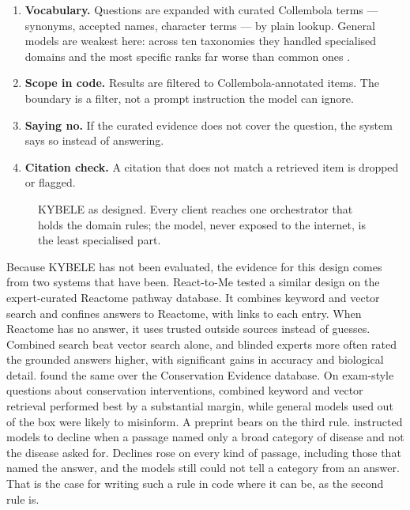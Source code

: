 \begin{enumerate}
  \item \textbf{Vocabulary.} Questions are expanded with curated Collembola
    terms --- synonyms, accepted names, character terms --- by plain lookup.
    General models are weakest here: across ten taxonomies they handled
    specialised domains and the most specific ranks far worse than common
    ones \parencite{sun2024taxoglimpse}.
  \item \textbf{Scope in code.} Results are filtered to Collembola-annotated
    items. The boundary is a filter, not a prompt instruction the model can
    ignore.
  \item \textbf{Saying no.} If the curated evidence does not cover the question,
    the system says so instead of answering.
  \item \textbf{Citation check.} A citation that does not match a retrieved item
    is dropped or flagged.
\end{enumerate}

\begin{figure}[htbp]
\centering
{}
\caption{KYBELE as designed. Every client reaches one orchestrator that holds
the domain rules; the model, never exposed to the internet, is the least
specialised part.}
\label{fig:kybele}
\end{figure}

Because KYBELE has not been evaluated, the evidence for this design comes from
two systems that have been. React-to-Me \parencite{mohammadi2025reacttome}
tested a similar design on the expert-curated Reactome pathway database. It combines keyword and vector search
and confines answers to Reactome, with links to each entry. When Reactome has
no answer, it uses trusted outside sources instead of guesses. Combined search beat
vector search alone, and blinded experts more often rated the grounded answers
higher, with significant gains in accuracy and biological detail.
\textcite{iyer2025conservationevidence} found the same over the Conservation
Evidence database. On exam-style questions about conservation interventions,
combined keyword and vector retrieval performed best by a substantial margin,
while general models used out of the box were likely to misinform. A preprint
bears on the third rule. \textcite{rayeed2026clade} instructed models to
decline when a passage named only a broad category of disease and not the
disease asked for. Declines rose on every kind of passage, including those
that named the answer, and the models still could not tell a category from an
answer. That is the case for writing such a rule in code where it can be, as
the second rule is.

